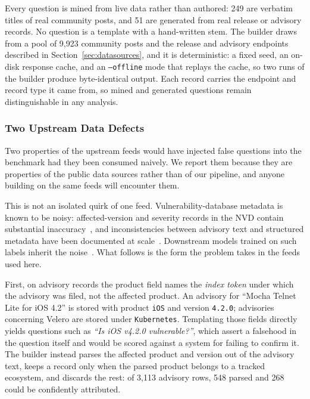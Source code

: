 \documentclass[acmsmall,review,anonymous,screen]{acmart}
\begin{document}
Every question is mined from live data rather than authored: 249 are verbatim
titles of real community posts, and 51 are generated from real release or
advisory records. No question is a template with a hand-written stem. The
builder draws from a pool of 9,923 community posts and the release and advisory
endpoints described in Section~\ref{sec:datasources}, and it is deterministic:
a fixed seed, an on-disk response cache, and an \texttt{--offline} mode that
replays the cache, so two runs of the builder produce byte-identical output.
Each record carries the endpoint and record type it came from, so mined and
generated questions remain distinguishable in any analysis.

\subsubsection{Two Upstream Data Defects}

Two properties of the upstream feeds would have injected false questions into
the benchmark had they been consumed naively. We report them because they are
properties of the public data sources rather than of our pipeline, and anyone
building on the same feeds will encounter them.

This is not an isolated quirk of one feed. Vulnerability-database metadata is
known to be noisy: affected-version and severity records in the NVD contain
substantial inaccuracy~\cite{croft2023dataquality,croft2022severity,anwar2022nvd},
and inconsistencies between advisory text and structured metadata have been
documented at scale~\cite{dong2019inconsistencies}. Downstream models trained on
such labels inherit the noise~\cite{chakraborty2022vulndetection}. What follows is
the form the problem takes in the feeds used here.

First, on advisory records the product field names the \emph{index token} under
which the advisory was filed, not the affected product. An advisory for ``Mocha
Telnet Lite for iOS 4.2'' is stored with product \texttt{iOS} and version
\texttt{4.2.0}; advisories concerning Velero are stored under
\texttt{Kubernetes}. Templating those fields directly yields questions such as
\emph{``Is iOS v4.2.0 vulnerable?''}, which assert a falsehood in the question
itself and would be scored against a system for failing to confirm it. The
builder instead parses the affected product and version out of the advisory
text, keeps a record only when the parsed product belongs to a tracked
ecosystem, and discards the rest: of 3,113 advisory rows, 548 parsed and 268
could be confidently attributed.
\end{document}

